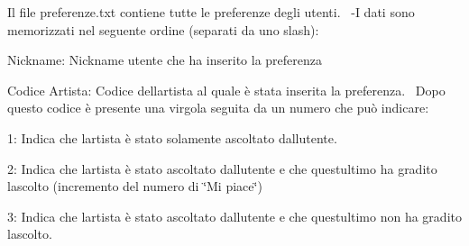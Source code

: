 Il file preferenze.\+txt contiene tutte le preferenze degli utenti.~\newline
 -\/I dati sono memorizzati nel seguente ordine (separati da uno slash)\+:
\begin{DoxyEnumerate}
\item Nickname\+: Nickname utente che ha inserito la preferenza
\item Codice Artista\+: Codice dell\textquotesingle{}artista al quale è stata inserita la preferenza.~\newline
 Dopo questo codice è presente una virgola seguita da un numero che può indicare\+:~\newline

\begin{DoxyEnumerate}
\item 1\+: Indica che l\textquotesingle{}artista è stato solamente ascoltato dall\textquotesingle{}utente.
\item 2\+: Indica che l\textquotesingle{}artista è stato ascoltato dall\textquotesingle{}utente e che quest\textquotesingle{}ultimo ha gradito l\textquotesingle{}ascolto (incremento del numero di \char`\"{}\+Mi piace\char`\"{})
\item 3\+: Indica che l\textquotesingle{}artista è stato ascoltato dall\textquotesingle{}utente e che quest\textquotesingle{}ultimo non ha gradito l\textquotesingle{}ascolto. 
\end{DoxyEnumerate}
\end{DoxyEnumerate}